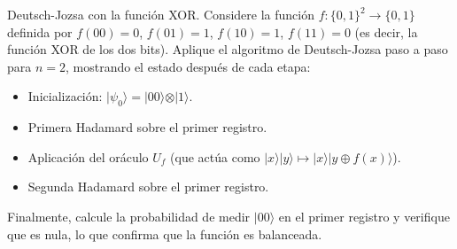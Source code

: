 {\bfseries

Deutsch-Jozsa con la función XOR. Considere la función $f:\{0,1\}^2 \rightarrow \{0,1\}$ definida por $f(00)=0$, $f(01)=1$, $f(10)=1$, $f(11)=0$ (es decir, la función XOR de los dos bits).
Aplique el algoritmo de Deutsch-Jozsa paso a paso para $n=2$, mostrando el estado después de cada etapa:
\begin{itemize}
    \item Inicialización: $\vert \psi_0 \rangle = \vert 00 \rangle \otimes \vert 1 \rangle$.
    \item Primera Hadamard sobre el primer registro.
    \item Aplicación del oráculo $U_f$ (que actúa como $\vert x \rangle \vert y \rangle \mapsto \vert x \rangle \vert y \oplus f(x) \rangle$).
    \item Segunda Hadamard sobre el primer registro.
\end{itemize}
Finalmente, calcule la probabilidad de medir $\vert 00 \rangle$ en el primer registro y verifique
que es nula, lo que confirma que la función es balanceada.}

\vspace{.5cm}

